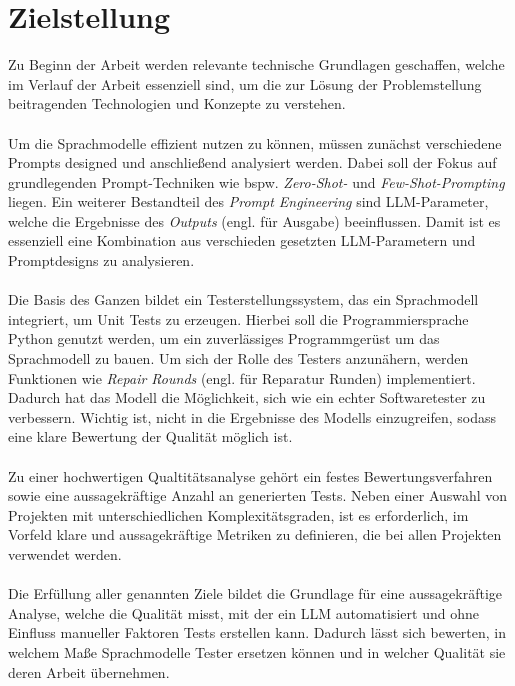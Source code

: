 \section{Zielstellung} 
Zu Beginn der Arbeit werden relevante technische Grundlagen geschaffen, welche im Verlauf der Arbeit essenziell sind, um die zur Lösung der Problemstellung beitragenden Technologien und Konzepte zu verstehen.\\\\ Um die Sprachmodelle effizient nutzen zu können, müssen zunächst verschiedene Prompts designed und anschließend analysiert werden. Dabei soll der Fokus auf grundlegenden Prompt-Techniken wie bspw. \textit{Zero-Shot-} und \textit{Few-Shot-Prompting} liegen. Ein weiterer Bestandteil des \textit{Prompt Engineering} sind LLM-Parameter, welche die Ergebnisse des \textit{Outputs} (engl. für Ausgabe) beeinflussen. Damit ist es essenziell eine Kombination aus verschieden gesetzten LLM-Parametern und Promptdesigns zu analysieren.\\\\ Die Basis des Ganzen bildet ein Testerstellungssystem, das ein Sprachmodell integriert, um Unit Tests zu erzeugen. Hierbei soll die Programmiersprache Python genutzt werden, um ein zuverlässiges Programmgerüst um das Sprachmodell zu bauen. 
Um sich der Rolle des Testers anzunähern, werden Funktionen wie \textit{Repair Rounds} (engl. für Reparatur Runden) implementiert. Dadurch hat das Modell die Möglichkeit, sich wie ein echter Softwaretester zu verbessern. Wichtig ist, nicht in die Ergebnisse des Modells einzugreifen, sodass eine klare Bewertung der Qualität möglich ist.\\\\ Zu einer hochwertigen Qualtitätsanalyse gehört ein festes Bewertungsverfahren sowie eine aussagekräftige Anzahl an generierten Tests. Neben einer Auswahl von Projekten mit unterschiedlichen Komplexitätsgraden, ist es erforderlich, im Vorfeld klare und aussagekräftige Metriken zu definieren, die bei allen Projekten verwendet werden.\\\\ Die Erfüllung aller genannten Ziele bildet die Grundlage für eine aussagekräftige Analyse, welche die Qualität misst, mit der ein LLM automatisiert und ohne Einfluss manueller Faktoren Tests erstellen kann. Dadurch lässt sich bewerten, in welchem Maße Sprachmodelle Tester ersetzen können und in welcher Qualität sie deren Arbeit übernehmen.
